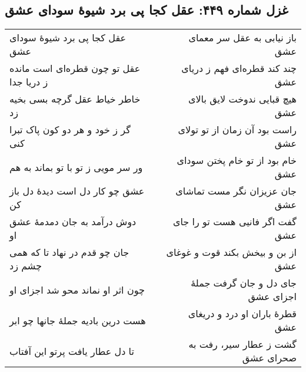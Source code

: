 \begin{center}
\section*{غزل شماره ۴۴۹: عقل کجا پی برد شیوهٔ سودای عشق}
\label{sec:449}
\begin{longtable}{l p{0.5cm} r}
عقل کجا پی برد شیوهٔ سودای عشق
&&
باز نیابی به عقل سر معمای عشق
\\
عقل تو چون قطره‌ای است مانده ز دریا جدا
&&
چند کند قطره‌ای فهم ز دریای عشق
\\
خاطر خیاط عقل گرچه بسی بخیه زد
&&
هیچ قبایی ندوخت لایق بالای عشق
\\
گر ز خود و هر دو کون پاک تبرا کنی
&&
راست بود آن زمان از تو تولای عشق
\\
ور سر مویی ز تو با تو بماند به هم
&&
خام بود از تو خام پختن سودای عشق
\\
عشق چو کار دل است دیدهٔ دل باز کن
&&
جان عزیزان نگر مست تماشای عشق
\\
دوش درآمد به جان دمدمهٔ عشق او
&&
گفت اگر فانیی هست تو را جای عشق
\\
جان چو قدم در نهاد تا که همی چشم زد
&&
از بن و بیخش بکند قوت و غوغای عشق
\\
چون اثر او نماند محو شد اجزای او
&&
جای دل و جان گرفت جملهٔ اجزای عشق
\\
هست درین بادیه جملهٔ جانها چو ابر
&&
قطرهٔ باران او درد و دریغای عشق
\\
تا دل عطار یافت پرتو این آفتاب
&&
گشت ز عطار سیر، رفت به صحرای عشق
\\
\end{longtable}
\end{center}

